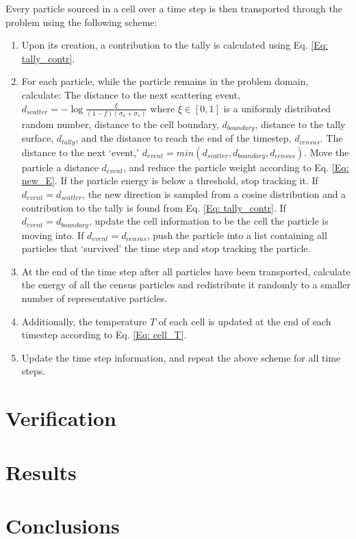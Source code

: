 \documentclass[]{article}
\begin{document}
    Every particle sourced in a cell over a time step is then transported through the problem using the following scheme:  
	\begin{enumerate}
		\item Upon its creation, a contribution to the tally is calculated using Eq. \ref{Eq: tally_contr}.
		\item For each particle, while the particle remains in the problem domain, calculate:
			\subitem The distance to the next scattering event, $d_{scatter} = -\log{\frac{\xi}{(1 - f)(\sigma_{a} + \sigma_{s})}}$ where $\xi \in [0,1]$ is a uniformly distributed random number, distance to the cell boundary, $d_{boundary}$, distance to the tally surface, $d_{tally}$, and the distance to reach the end of the timestep, $d_{census}$.
			\subitem The distance to the next `event,' $d_{event} = min(d_{scatter}, d_{boundary}, d_{census})$.
			\subitem Move the particle a distance $d_{event}$, and reduce the particle weight according to Eq. \ref{Eq: new_E}.
	     	\subitem If the particle energy is below a threshold, stop tracking it.
			\subitem If $d_{event} = d_{scatter}$, the new direction is sampled from a cosine distribution and a contribution to the tally is found from Eq. \ref{Eq: tally_contr}.
			\subitem If $d_{event} = d_{boundary}$, update the cell information to be the cell the particle is moving into.
			\subitem If $d_{event} = d_{census}$, push the particle into a list containing all particles that `survived' the time step and stop tracking the particle.
		\item At the end of the time step after all particles have been transported, calculate the energy of all the census particles and redistribute it randomly to a smaller number of representative particles.
		\item Additionally, the temperature $T$ of each cell is updated at the end of each timestep according to Eq. \ref{Eq: cell_T}.
			
		\item Update the time step information, and repeat the above scheme for all time steps.
	\end{enumerate}

\section{Verification}


\section{Results}


\section{Conclusions}
\end{document}
